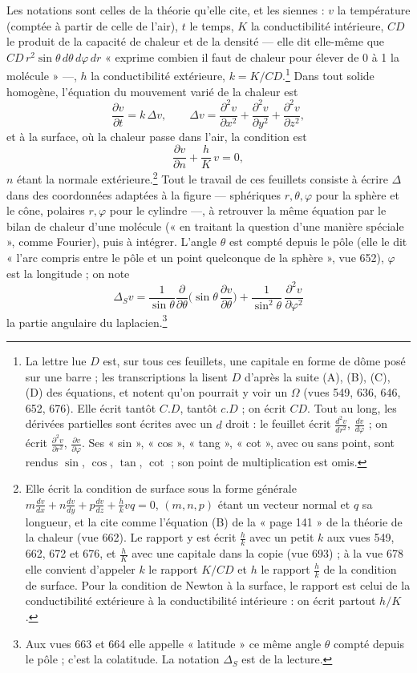 \documentclass[11pt,a4paper]{article}
\begin{document}
Les notations sont celles de la théorie qu'elle cite, et les siennes : $v$ la
température (comptée à partir de celle de l'air), $t$ le temps, $K$ la
conductibilité intérieure, $CD$ le produit de la capacité de chaleur et de la
densité — elle dit elle-même que $CD\,r^2\sin\theta\,d\theta\,d\varphi\,dr$
« exprime combien il faut de chaleur pour élever de 0 à 1 la molécule » —, $h$
la conductibilité extérieure, $k = K/CD$.\footnote{La lettre lue $D$ est, sur
tous ces feuillets, une capitale en forme de dôme posé sur une barre ; les
transcriptions la lisent $D$ d'après la suite (A), (B), (C), (D) des équations,
et notent qu'on pourrait y voir un $\Omega$ (vues 549, 636, 646, 652, 676).
Elle écrit tantôt $C.D$, tantôt $c.D$ ; on écrit $CD$. Tout au long, les
dérivées partielles sont écrites avec un $d$ droit : le feuillet écrit
$\frac{d^2v}{dr^2}$, $\frac{dv}{d\varphi}$ ; on écrit
$\frac{\partial^2 v}{\partial r^2}$, $\frac{\partial v}{\partial \varphi}$.
Ses « sin », « cos », « tang », « cot », avec ou sans point, sont rendus
$\sin$, $\cos$, $\tan$, $\cot$ ; son point de multiplication est omis.} Dans
tout solide homogène, l'équation du mouvement varié de la chaleur est
\[
\frac{\partial v}{\partial t} = k\,\Delta v, \qquad
\Delta v = \frac{\partial^2 v}{\partial x^2} + \frac{\partial^2 v}{\partial y^2}
+ \frac{\partial^2 v}{\partial z^2},
\]
et à la surface, où la chaleur passe dans l'air, la condition est
\[
\frac{\partial v}{\partial n} + \frac{h}{K}\,v = 0 ,
\]
$n$ étant la normale extérieure.\footnote{Elle écrit la condition de surface
sous la forme générale $m\frac{dv}{dx} + n\frac{dv}{dy} + p\frac{dv}{dz} +
\frac{h}{k}vq = 0$, $(m,n,p)$ étant un vecteur normal et $q$ sa longueur, et la
cite comme l'équation (B) de la « page 141 » de la théorie de la chaleur (vue
662). Le rapport y est écrit $\frac{h}{k}$ avec un petit $k$ aux vues 549, 662,
672 et 676, et $\frac{h}{K}$ avec une capitale dans la copie (vue 693) ; à la
vue 678 elle convient d'appeler $k$ le rapport $K/CD$ et $h$ le rapport
$\frac{h}{k}$ de la condition de surface. Pour la condition de Newton à la
surface, le rapport est celui de la conductibilité extérieure à la
conductibilité intérieure : on écrit partout $h/K$.} Tout le travail de ces
feuillets consiste à écrire $\Delta$ dans des coordonnées adaptées à la figure
— sphériques $r, \theta, \varphi$ pour la sphère et le cône, polaires $r,
\varphi$ pour le cylindre —, à retrouver la même équation par le bilan de
chaleur d'une molécule (« en traitant la question d'une manière spéciale »,
comme Fourier), puis à intégrer. L'angle $\theta$ est compté depuis le pôle
(elle le dit « l'arc compris entre le pôle et un point quelconque de la
sphère », vue 652), $\varphi$ est la longitude ; on note
\[
\Delta_S v = \frac{1}{\sin\theta}\frac{\partial}{\partial\theta}\Big(\sin\theta\,
\frac{\partial v}{\partial\theta}\Big) + \frac{1}{\sin^2\theta}\,
\frac{\partial^2 v}{\partial\varphi^2}
\]
la partie angulaire du laplacien.\footnote{Aux vues 663 et 664 elle appelle
« latitude » ce même angle $\theta$ compté depuis le pôle ; c'est la
colatitude. La notation $\Delta_S$ est de la lecture.}
\end{document}
